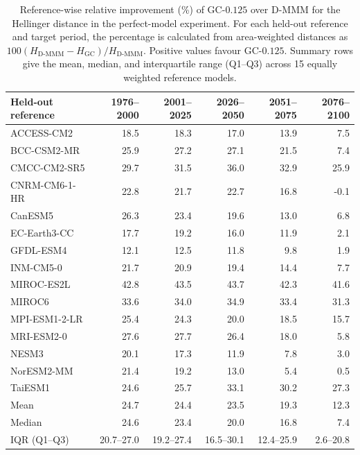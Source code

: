 \begin{table}[H]
\centering
\small
\setlength{\tabcolsep}{4pt}
\caption{Reference-wise relative improvement (\%) of GC-\(0.125\) over D-MMM for the Hellinger distance in the perfect-model experiment. For each held-out reference and target period, the percentage is calculated from area-weighted distances as \(100(H_{\mathrm{D\mbox{-}MMM}}-H_{\mathrm{GC}})/H_{\mathrm{D\mbox{-}MMM}}\). Positive values favour GC-\(0.125\). Summary rows give the mean, median, and interquartile range (Q1--Q3) across 15 equally weighted reference models.}
\label{tab:pme_reference_improvement}
\begin{tabular}{lrrrrr}
\toprule
Held-out reference & 1976--2000 & 2001--2025 & 2026--2050 & 2051--2075 & 2076--2100 \\
\midrule
ACCESS-CM2 & 18.5 & 18.3 & 17.0 & 13.9 & 7.5 \\
BCC-CSM2-MR & 25.9 & 27.2 & 27.1 & 21.5 & 7.4 \\
CMCC-CM2-SR5 & 29.7 & 31.5 & 36.0 & 32.9 & 25.9 \\
CNRM-CM6-1-HR & 22.8 & 21.7 & 22.7 & 16.8 & -0.1 \\
CanESM5 & 26.3 & 23.4 & 19.6 & 13.0 & 6.8 \\
EC-Earth3-CC & 17.7 & 19.2 & 16.0 & 11.9 & 2.1 \\
GFDL-ESM4 & 12.1 & 12.5 & 11.8 & 9.8 & 1.9 \\
INM-CM5-0 & 21.7 & 20.9 & 19.4 & 14.4 & 7.7 \\
MIROC-ES2L & 42.8 & 43.5 & 43.7 & 42.3 & 41.6 \\
MIROC6 & 33.6 & 34.0 & 34.9 & 33.4 & 31.3 \\
MPI-ESM1-2-LR & 25.4 & 24.3 & 20.0 & 18.5 & 15.7 \\
MRI-ESM2-0 & 27.6 & 27.7 & 26.4 & 18.0 & 5.8 \\
NESM3 & 20.1 & 17.3 & 11.9 & 7.8 & 3.0 \\
NorESM2-MM & 21.4 & 19.2 & 13.0 & 5.4 & 0.5 \\
TaiESM1 & 24.6 & 25.7 & 33.1 & 30.2 & 27.3 \\
\midrule
Mean & 24.7 & 24.4 & 23.5 & 19.3 & 12.3 \\
Median & 24.6 & 23.4 & 20.0 & 16.8 & 7.4 \\
IQR (Q1--Q3) & 20.7--27.0 & 19.2--27.4 & 16.5--30.1 & 12.4--25.9 & 2.6--20.8 \\
\bottomrule
\end{tabular}
\end{table}
